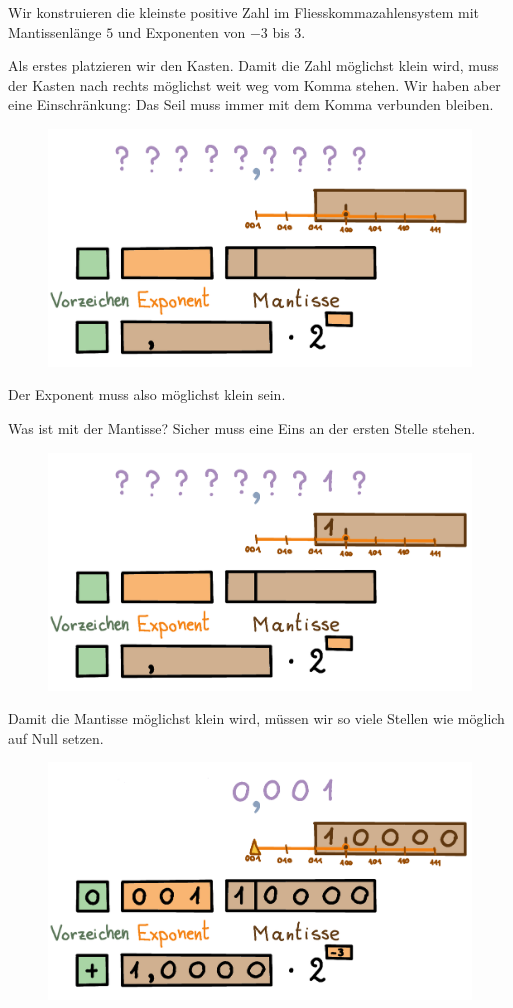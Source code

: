 \begin{beispiel}
Wir konstruieren die kleinste positive Zahl im Fliesskommazahlensystem mit Mantissenlänge \(5\) und Exponenten von \(-3\) bis \(3\).

Als erstes platzieren wir den Kasten. Damit die Zahl möglichst klein wird, muss der Kasten nach rechts möglichst weit weg vom Komma stehen. Wir haben aber eine Einschränkung: Das Seil muss immer mit dem Komma verbunden bleiben.
\begin{figure}[H]
\centering
\includegraphics[width=0.85\linewidth]{Pictures/kleinsteZahl1.png}
\end{figure}
Der Exponent muss also möglichst klein sein.

Was ist mit der Mantisse? Sicher muss eine Eins an der ersten Stelle stehen.
\begin{figure}[H]
\centering
\includegraphics[width=0.85\linewidth]{Pictures/kleinsteZahl2.png}
\end{figure}

Damit die Mantisse möglichst klein wird, müssen wir so viele Stellen wie möglich auf Null setzen.
\begin{figure}[H]
\centering
\includegraphics[width=0.85\linewidth]{Pictures/kleinsteZahl3.png}
\end{figure}


\end{beispiel}
